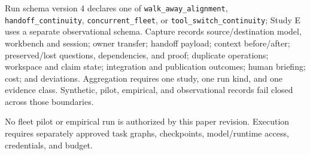 Run schema version 4 declares one of \texttt{walk\_away\_alignment}, \texttt{handoff\_continuity}, \texttt{concurrent\_fleet}, or \texttt{tool\_switch\_continuity}; Study E uses a separate observational schema. Capture records source/destination model, workbench and session; owner transfer; handoff payload; context before/after; preserved/lost questions, dependencies, and proof; duplicate operations; workspace and claim state; integration and publication outcomes; human briefing; cost; and deviations. Aggregation requires one study, one run kind, and one evidence class. Synthetic, pilot, empirical, and observational records fail closed across those boundaries.

No fleet pilot or empirical run is authorized by this paper revision. Execution requires separately approved task graphs, checkpoints, model/runtime access, credentials, and budget.

